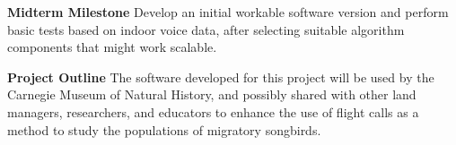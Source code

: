 \documentclass{article} %
\begin{document}
{\bf Midterm Milestone} Develop an initial workable software version and perform basic tests based on indoor voice data, after selecting suitable algorithm components that might work scalable.

{\bf Project Outline} The software developed for this project will be used by the Carnegie Museum of Natural History, and possibly shared with other land managers, researchers, and educators to enhance the use of flight calls as a method to study the populations of migratory songbirds. %



\end{document}
